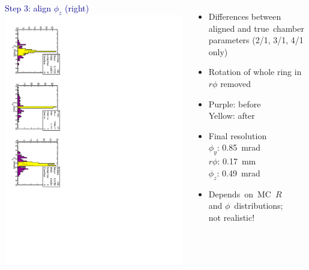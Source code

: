 \documentclass[compress]{beamer}
\begin{document}
\begin{frame}
\begin{columns}
\textcolor{darkblue}{Step 3: align $\phi_z$ (right)}
\includegraphics[height=\linewidth, angle=90]{align_step3.pdf}

\begin{itemize}
\item Differences between aligned and \mbox{true chamber\hspace{-0.5 cm}} parameters (2/1, 3/1, 4/1 only)

\item Rotation of whole ring in $r\phi$ removed

\item Purple: before \\ Yellow: after

\item Final resolution \\ $\phi_y$: 0.85~mrad \\ $r\phi$: 0.17~mm \\ $\phi_z$: 0.49~mrad

\item \mbox{Depends on MC $R$\hspace{-1 cm}} \\ and \mbox{$\phi$ distributions;\hspace{-1 cm}} \\ not realistic!
\end{itemize}
\end{columns}
\end{frame}
\end{document}
